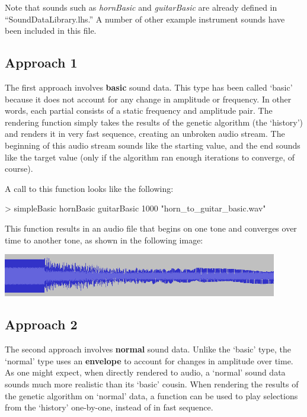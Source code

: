 \documentclass[11pt]{article}
\begin{document}
Note that sounds such as \emph{hornBasic} and \emph{guitarBasic} are already defined in ``SoundDataLibrary.lhs.'' A number of other example instrument sounds have been included in this file.

\subsection{Approach 1}

The first approach involves {\bf basic} sound data. This type has been called `basic' because it does not account for any change in amplitude or frequency. In other words, each partial consists of a static frequency and amplitude pair. The rendering function simply takes the results of the genetic algorithm (the `history') and renders it in very fast sequence, creating an unbroken audio stream. The beginning of this audio stream sounds like the starting value, and the end sounds like the target value (only if the algorithm ran enough iterations to converge, of course).

A call to this function looks like the following:

\begin{code}
> simpleBasic hornBasic guitarBasic 1000 "horn_to_guitar_basic.wav"
\end{code}

This function results in an audio file that begins on one tone and converges over time to another tone, as shown in the following image:

\includegraphics[width=120mm]{basic_wav.png}

\subsection{Approach 2}

The second approach involves {\bf normal} sound data. Unlike the `basic' type, the `normal' type uses an {\bf envelope} to account for changes in amplitude over time. As one might expect, when directly rendered to audio, a `normal' sound data sounds much more realistic than its `basic' cousin. When rendering the results of the genetic algorithm on `normal' data, a function can be used to play selections from the `history' one-by-one, instead of in fast sequence.
\end{document}
